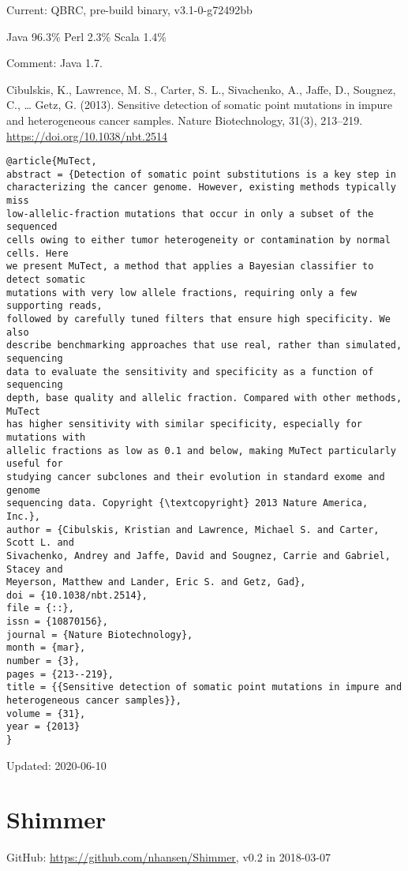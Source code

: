 \documentclass[]{article}
\begin{document}
Current: QBRC, pre-build binary, v3.1-0-g72492bb

Java 96.3\% Perl 2.3\% Scala 1.4\%

Comment: Java 1.7.

Cibulskis, K., Lawrence, M. S., Carter, S. L., Sivachenko, A., Jaffe, D., Sougnez, C., … Getz, G. (2013). Sensitive detection of somatic point mutations in impure and heterogeneous cancer samples. Nature Biotechnology, 31(3), 213–219. \url{https://doi.org/10.1038/nbt.2514}

\begin{verbatim}
@article{MuTect,
abstract = {Detection of somatic point substitutions is a key step in
characterizing the cancer genome. However, existing methods typically miss
low-allelic-fraction mutations that occur in only a subset of the sequenced
cells owing to either tumor heterogeneity or contamination by normal cells. Here
we present MuTect, a method that applies a Bayesian classifier to detect somatic
mutations with very low allele fractions, requiring only a few supporting reads,
followed by carefully tuned filters that ensure high specificity. We also
describe benchmarking approaches that use real, rather than simulated, sequencing
data to evaluate the sensitivity and specificity as a function of sequencing
depth, base quality and allelic fraction. Compared with other methods, MuTect
has higher sensitivity with similar specificity, especially for mutations with
allelic fractions as low as 0.1 and below, making MuTect particularly useful for
studying cancer subclones and their evolution in standard exome and genome
sequencing data. Copyright {\textcopyright} 2013 Nature America, Inc.},
author = {Cibulskis, Kristian and Lawrence, Michael S. and Carter, Scott L. and
Sivachenko, Andrey and Jaffe, David and Sougnez, Carrie and Gabriel, Stacey and
Meyerson, Matthew and Lander, Eric S. and Getz, Gad},
doi = {10.1038/nbt.2514},
file = {::},
issn = {10870156},
journal = {Nature Biotechnology},
month = {mar},
number = {3},
pages = {213--219},
title = {{Sensitive detection of somatic point mutations in impure and
heterogeneous cancer samples}},
volume = {31},
year = {2013}
}
\end{verbatim}

Updated: 2020-06-10

\section{Shimmer}

GitHub: \url{https://github.com/nhansen/Shimmer}, v0.2 in 2018-03-07
\end{document}
